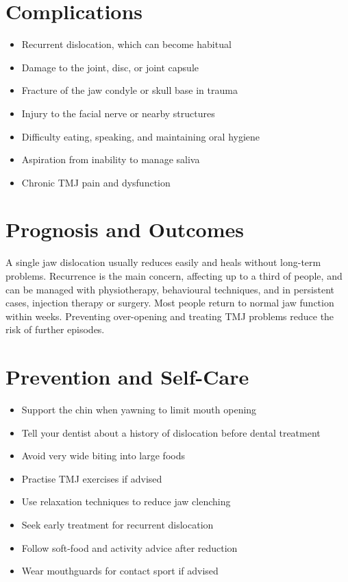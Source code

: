 \section*{Complications}
\begin{itemize}
    \item Recurrent dislocation, which can become habitual
    \item Damage to the joint, disc, or joint capsule
    \item Fracture of the jaw condyle or skull base in trauma
    \item Injury to the facial nerve or nearby structures
    \item Difficulty eating, speaking, and maintaining oral hygiene
    \item Aspiration from inability to manage saliva
    \item Chronic TMJ pain and dysfunction
\end{itemize}

\section*{Prognosis and Outcomes}
A single jaw dislocation usually reduces easily and heals without long-term problems. Recurrence is the main concern, affecting up to a third of people, and can be managed with physiotherapy, behavioural techniques, and in persistent cases, injection therapy or surgery. Most people return to normal jaw function within weeks. Preventing over-opening and treating TMJ problems reduce the risk of further episodes.

\section*{Prevention and Self-Care}
\begin{itemize}
    \item Support the chin when yawning to limit mouth opening
    \item Tell your dentist about a history of dislocation before dental treatment
    \item Avoid very wide biting into large foods
    \item Practise TMJ exercises if advised
    \item Use relaxation techniques to reduce jaw clenching
    \item Seek early treatment for recurrent dislocation
    \item Follow soft-food and activity advice after reduction
    \item Wear mouthguards for contact sport if advised
\end{itemize}

